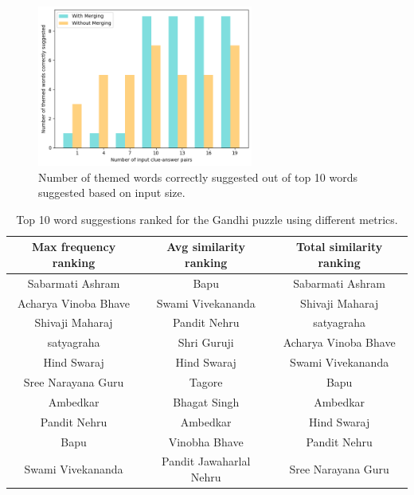 \documentclass[twoside]{article}
\begin{document}
\begin{figure}
  \centering
  \includegraphics[height=150pt]{images/merging_vs_no_words_bar.png}
  \caption{Number of themed words correctly suggested out of top 10 words suggested based on input size.}
  \label{fig:fig3.6}
\end{figure}

\begin{table}[h!]
  \begin{center}
    \begin{tabular}{c c c}
      \toprule
      \textbf{Max frequency ranking} & \textbf{Avg similarity ranking} & \textbf{Total similarity ranking}  \\ 
      \midrule
      Sabarmati Ashram & Bapu & Sabarmati Ashram \\
      Acharya Vinoba Bhave & Swami Vivekananda & Shivaji Maharaj\\
      Shivaji Maharaj & Pandit Nehru & satyagraha\\
      satyagraha & Shri Guruji & Acharya Vinoba Bhave\\
      Hind Swaraj & Hind Swaraj & Swami Vivekananda \\
	Sree Narayana Guru & Tagore & Bapu \\
       Ambedkar & Bhagat Singh & Ambedkar \\
      Pandit Nehru & Ambedkar & Hind Swaraj \\
      Bapu & Vinobha Bhave & Pandit Nehru \\
      Swami Vivekananda& Pandit Jawaharlal Nehru & Sree Narayana Guru \\
      \bottomrule
    \end{tabular}
    \caption{Top 10 word suggestions ranked for the Gandhi puzzle using different metrics.}
    \label{tab:table6}
  \end{center}
\end{table}
\end{document}
